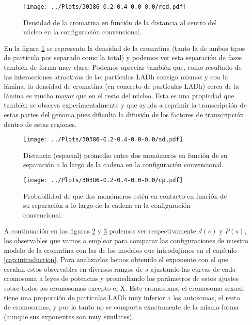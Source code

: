 \begin{figure}[t]
    \centering
    \texttt{[image: ../Plots/30386-0.2-0.4-0.0-0.0/rcd.pdf]}
    \caption{Densidad de la cromatina en función de la distancia al centro del núcleo en la configuración convencional.}
    \label{fig:rcd_c}
\end{figure}

En la figura \ref{fig:rcd_c} se representa la densidad de la cromatina (tanto la de ambos tipos de partícula por separado como la total) y podemos ver esta separación de fases también de forma muy clara. Podemos apreciar también que, como resultado de las interacciones atractivas de las partículas LADh consigo mismas y con la lámina, la densidad de cromatina (en concreto de partículas LADh) cerca de la lámina es mucho mayor que en el resto del núcleo. Esta es una propiedad que también se observa experimentalmente y que ayuda a reprimir la transcripción de estas partes del genoma pues dificulta la difusión de los factores de transcripción dentro de estas regiones.

\begin{figure}[p]
    \centering
    \texttt{[image: ../Plots/30386-0.2-0.4-0.0-0.0/sd.pdf]}
    \caption{Distancia (espacial) promedio entre dos monómeros en función de su separación a lo largo de la cadena en la configuración convencional.}
    \label{fig:sd_c}
\end{figure}

\begin{figure}[p]
    \centering
    \texttt{[image: ../Plots/30386-0.2-0.4-0.0-0.0/cp.pdf]}
    \caption{Probabilidad de que dos monómeros estén en contacto en función de su separación a lo largo de la cadena en la configuración convencional.}
    \label{fig:cp_c}
\end{figure}

A continuación en las figuras \ref{fig:sd_c} y \ref{fig:cp_c} podemos ver respectivamente $d(s)$ y $P(s)$, los observables que vamos a emplear para comparar las configuraciones de nuestro modelo de la cromatina con las de los modelos que introdujimos en el capítulo \ref{cap:introduction}. Para analizarlos hemos obtenido el exponente con el que escalan estos observables en diversos rangos de $s$ ajustando las curvas de cada cromosoma a leyes de potencias y promediando los parámetros de estos ajustes sobre todos los cromosomas excepto el X. Este cromosoma, el cromosoma sexual, tiene una proporción de partículas LADh muy inferior a los autosomas, el resto de cromosomas, y por lo tanto no se comporta exactamente de la misma forma (aunque sus exponentes son muy similares).

